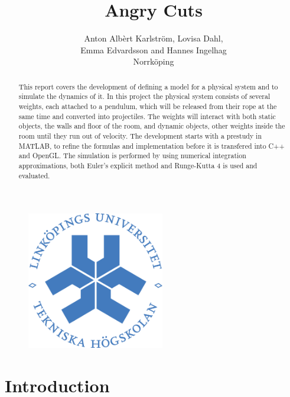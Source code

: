 \documentclass[a4paper,12pt,twoside,english]{article}
\title{Angry Cuts}
\author{Anton Alb\`{e}rt Karlstr\"{o}m, Lovisa Dahl, \\Emma Edvardsson
 and Hannes Ingelhag \\Norrk\"{o}ping}
\begin{document}


\begin{figure}
\begin{center}
\includegraphics[width=6cm]{bilder/LiTH_sigill_col.png} 
\end{center}
\end{figure}

\maketitle
{}

\newpage
\begin{abstract}
This report covers the development of defining a model for a physical system and to simulate the dynamics of it. In this project the physical system consists of several weights, each attached to a pendulum, which will be released from their rope at the same time and converted into projectiles. The weights will interact with both static objects, the walls and floor of the room, and dynamic objects, other weights inside the room until they run out of velocity. The development starts with a prestudy in MATLAB, to refine the formulas and implementation before it is transfered into C++ and OpenGL. The simulation is performed by using numerical integration approximations, both Euler's explicit method and Runge-Kutta 4 is used and evaluated. 
\vfill
\end{abstract}
\newpage
\tableofcontents  %

\newpage

\pagestyle{plain}


\setcounter{page}{1}
\section{Introduction}
\end{document}
